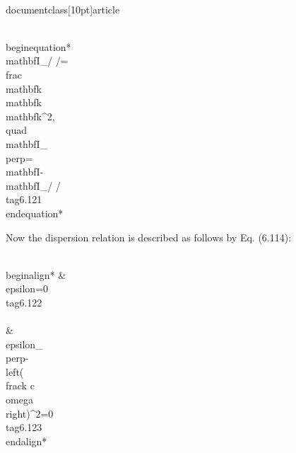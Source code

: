 \\documentclass[10pt]{article}
\begin{document}
{{{{\\begin{equation*}
\\mathbf{I}_{/ /}=\\frac{\\mathbf{k} \\mathbf{k}}{\\mathbf{k}^{2}}, \\quad \\mathbf{I}_{\\perp}=\\mathbf{I}-\\mathbf{I}_{/ /} \\tag{6.121}
\\end{equation*}


Now the dispersion relation is described as follows by Eq. (6.114):


\\begin{align*}
& \\epsilon=0  \\tag{6.122}\\\\
& \\epsilon_{\\perp}-\\left(\\frac{k c}{\\omega}\\right)^{2}=0 \\tag{6.123}
\\end{align*}


}}}}
\end{document}
